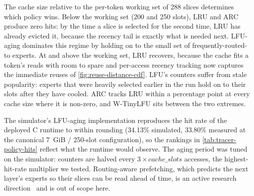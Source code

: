 The cache size relative to the per-token working set of 288 slices determines which policy wins.
Below the working set (200 and 250 slots), LRU and ARC produce zero hits: by the time a slice is selected for the second time, LRU has already evicted it, because the recency tail is exactly what is needed next.
LFU-aging dominates this regime by holding on to the small set of frequently-routed-to experts.
At and above the working set, LRU recovers, because the cache fits a token's reads with room to spare and per-access recency tracking now captures the immediate reuses of \autoref{fig:reuse-distance-cdf}.
LFU's counters suffer from stale popularity: experts that were heavily selected earlier in the run hold on to their slots after they have cooled.
ARC tracks LRU within a percentage point at every cache size where it is non-zero, and W-TinyLFU sits between the two extremes.

The simulator's LFU-aging implementation reproduces the hit rate of the deployed C runtime to within rounding (34.13\% simulated, 33.80\% measured at the canonical 7~GiB / 250-slot configuration), so the rankings in \autoref{tab:tracer-policy-hits} reflect what the runtime would observe.
The aging period was tuned on the simulator: counters are halved every $3 \times \mathit{cache\_slots}$ accesses, the highest-hit-rate multiplier we tested.
Routing-aware prefetching, which predicts the next layer's experts so their slices can be read ahead of time, is an active research direction~\cite{jia2025activeflow,xue2024moeinfinity} and is out of scope here.
